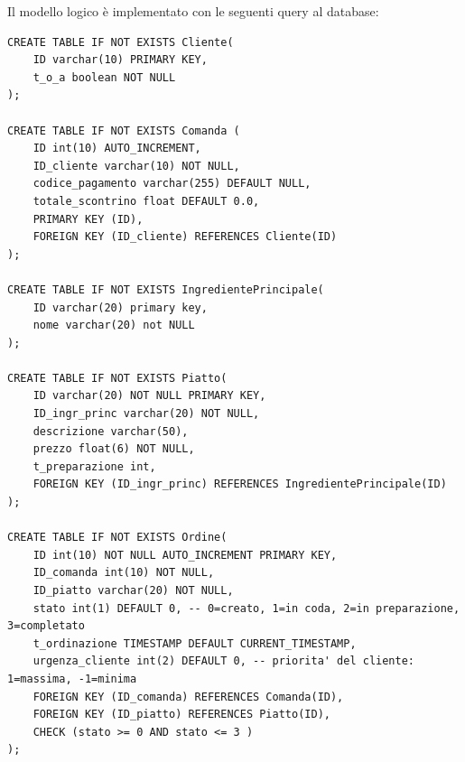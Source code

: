 \newpage
Il modello logico è implementato con le seguenti query al database:

\begin{lstlisting}[style=sqlstyle,caption=Query del database in SQL,label=lst:sqlcode]
CREATE TABLE IF NOT EXISTS Cliente(
    ID varchar(10) PRIMARY KEY,
    t_o_a boolean NOT NULL
);

CREATE TABLE IF NOT EXISTS Comanda (
    ID int(10) AUTO_INCREMENT,
    ID_cliente varchar(10) NOT NULL,
    codice_pagamento varchar(255) DEFAULT NULL,
    totale_scontrino float DEFAULT 0.0,
    PRIMARY KEY (ID),
    FOREIGN KEY (ID_cliente) REFERENCES Cliente(ID)
);

CREATE TABLE IF NOT EXISTS IngredientePrincipale(
    ID varchar(20) primary key,
    nome varchar(20) not NULL
);

CREATE TABLE IF NOT EXISTS Piatto(
    ID varchar(20) NOT NULL PRIMARY KEY,
    ID_ingr_princ varchar(20) NOT NULL,
    descrizione varchar(50),
    prezzo float(6) NOT NULL,
    t_preparazione int,
    FOREIGN KEY (ID_ingr_princ) REFERENCES IngredientePrincipale(ID)
);

CREATE TABLE IF NOT EXISTS Ordine(
    ID int(10) NOT NULL AUTO_INCREMENT PRIMARY KEY,
    ID_comanda int(10) NOT NULL,
    ID_piatto varchar(20) NOT NULL,
    stato int(1) DEFAULT 0, -- 0=creato, 1=in coda, 2=in preparazione, 3=completato
    t_ordinazione TIMESTAMP DEFAULT CURRENT_TIMESTAMP,
    urgenza_cliente int(2) DEFAULT 0, -- priorita' del cliente: 1=massima, -1=minima
    FOREIGN KEY (ID_comanda) REFERENCES Comanda(ID),
    FOREIGN KEY (ID_piatto) REFERENCES Piatto(ID),
    CHECK (stato >= 0 AND stato <= 3 )
);
\end{lstlisting}

\clearpage